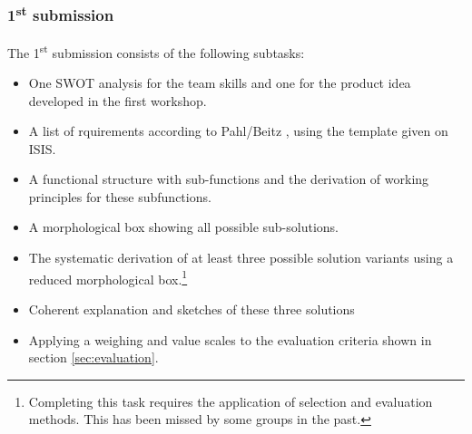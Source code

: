 \documentclass[headinclude=true]{scrartcl}
\begin{document}
\subsubsection{1\textsuperscript{st} submission}
The 1\textsuperscript{st} submission consists of the following subtasks:
\begin{itemize}
 \item One SWOT analysis for the team skills and one for the product idea developed in the first workshop.
 \item A list of rquirements according to Pahl/Beitz \cite{Pahl2007}, using the template given on ISIS.
 \item A functional structure with sub-functions and the derivation of working principles for these subfunctions.
 \item A morphological box showing all possible sub-solutions.
 \item The systematic derivation of at least three possible solution variants using a reduced morphological box.\footnote{Completing this task requires the application of selection and evaluation methods. This has been missed by some groups in the past.}
 \item Coherent explanation and sketches of these three solutions
 \item Applying a weighing and value scales to the evaluation criteria shown in section \ref{sec:evaluation}.
\end{itemize}
\end{document}
